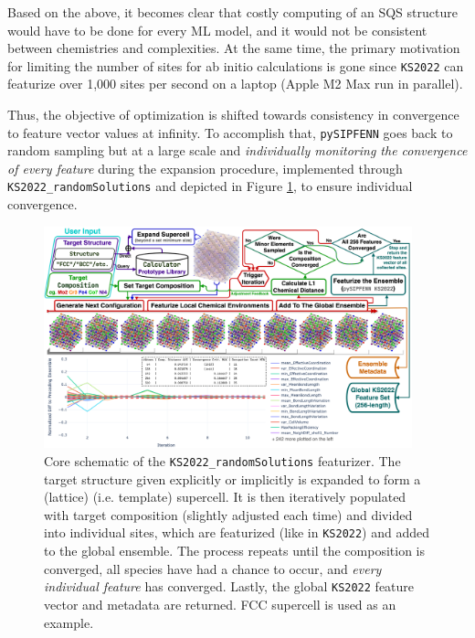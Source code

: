 Based on the above, it becomes clear that costly computing of an SQS structure would have to be done for every ML model, and it would not be consistent between chemistries and complexities. At the same time, the primary motivation for limiting the number of sites for ab initio calculations is gone since \texttt{KS2022} can featurize over 1,000 sites per second on a laptop (Apple M2 Max run in parallel). 

Thus, the objective of optimization is shifted towards consistency in convergence to feature vector values at infinity. To accomplish that, \texttt{pySIPFENN} goes back to random sampling but at a large scale and \emph{individually monitoring the convergence of every feature} during the expansion procedure, implemented through \texttt{KS2022\_randomSolutions} and depicted in Figure \ref{pysipfenn:fig:KS2022randomSolution}, to ensure individual convergence. 


\begin{figure}[h]
    \centering
    \includegraphics[width=0.95\textwidth]{pysipfenn/KS2022_randomSolution.png}
    \caption{
    Core schematic of the \texttt{KS2022\_randomSolutions} featurizer. The target structure given explicitly or implicitly is expanded to form a (lattice) (i.e. template) supercell. It is then iteratively populated with target composition (slightly adjusted each time) and divided into individual sites, which are featurized (like in \texttt{KS2022}) and added to the global ensemble. The process repeats until the composition is converged, all species have had a chance to occur, and \emph{every individual feature} has converged. Lastly, the global \texttt{KS2022} feature vector and metadata are returned. FCC supercell is used as an example.
    }
    \label{pysipfenn:fig:KS2022randomSolution}
\end{figure}


